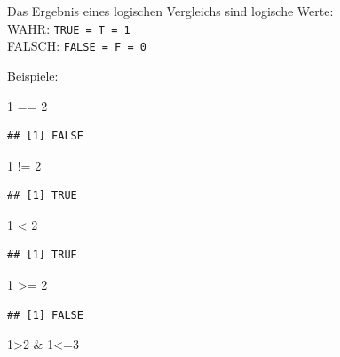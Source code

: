 \documentclass[
]{book}
\newenvironment{Shaded}{\begin{snugshade}}{\end{snugshade}}
\newcommand{\DecValTok}[1]{\textcolor[rgb]{0.00,0.00,0.81}{#1}}
\newcommand{\SpecialCharTok}[1]{\textcolor[rgb]{0.00,0.00,0.00}{#1}}
\begin{document}
Das Ergebnis eines logischen Vergleichs sind logische Werte:\\
WAHR: \texttt{TRUE\ =\ T\ =\ 1}\\
FALSCH: \texttt{FALSE\ =\ F\ =\ 0}

Beispiele:

\begin{Shaded}
\begin{Highlighting}[]
\DecValTok{1} \SpecialCharTok{==} \DecValTok{2}
\end{Highlighting}
\end{Shaded}

\begin{verbatim}
## [1] FALSE
\end{verbatim}

\begin{Shaded}
\begin{Highlighting}[]
\DecValTok{1} \SpecialCharTok{!=} \DecValTok{2}
\end{Highlighting}
\end{Shaded}

\begin{verbatim}
## [1] TRUE
\end{verbatim}

\begin{Shaded}
\begin{Highlighting}[]
\DecValTok{1} \SpecialCharTok{\textless{}} \DecValTok{2}
\end{Highlighting}
\end{Shaded}

\begin{verbatim}
## [1] TRUE
\end{verbatim}

\begin{Shaded}
\begin{Highlighting}[]
\DecValTok{1} \SpecialCharTok{\textgreater{}=} \DecValTok{2}
\end{Highlighting}
\end{Shaded}

\begin{verbatim}
## [1] FALSE
\end{verbatim}

\begin{Shaded}
\begin{Highlighting}[]
\DecValTok{1}\SpecialCharTok{\textgreater{}}\DecValTok{2} \SpecialCharTok{\&} \DecValTok{1}\SpecialCharTok{\textless{}=}\DecValTok{3}
\end{Highlighting}
\end{Shaded}
\end{document}
